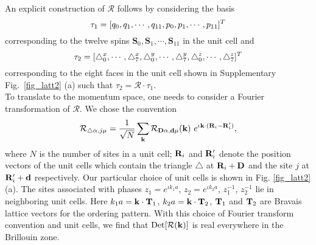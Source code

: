 \documentclass[a4paper,aps,prl,floatfix,showpacs,superscriptaddress,notitlepage]{revtex4-1}
\def\spin{\mathbf{S}} %
\begin{document}
An explicit construction of ${\mathcal R}$ follows by considering the basis 
\begin{equation}
 \tau_1= [q_0,q_1,\cdots,\\ q_{11},p_0,p_1,\cdots,p_{11}]^T \nonumber \\
\end{equation}
corresponding to the twelve spins $\spin_0,\spin_1,\cdots,\spin_{11}$ in the unit cell and 
\begin{equation}
 \tau_2=[\triangle_0^x,\cdots,\triangle_7^x,\triangle_0^y,\cdots,\triangle_7^y,\triangle_0^z,\cdots,\triangle_7^z]^T \nonumber \\
\end{equation}
corresponding to the eight faces in the unit cell shown in Supplementary Fig.~\ref{fig_latt2} (a) such that $\tau_2=\mathcal{R}\cdot \tau_1$. \\


To translate to the momentum space, one needs to consider a Fourier transformation of $\mathcal{R}$. We chose the convention
\begin{equation}
  {\mathcal R}_{\triangle\alpha,j\mu} = \frac{1}{\sqrt{N}} \sum_{\bf{k}} {\mathcal R}_{{\bf{D}}\alpha,{\bf{d}}\mu} ({\bf{k}}) ~ e^{\iota {\bf{k}}\cdot({\bf{R}}_i-{\bf{R}}'_i)},
  \label{fourier_A}
\end{equation}
where $N$ is the number of sites in a unit cell; ${\bf{R}}_i$ and ${\bf{R}}'_i$ denote the position vectors of the unit cells which contain the triangle $\triangle$ at ${\bf{R}}_i+{\bf{D}}$ and the site $j$ at ${\bf{R}}'_i+{\bf{d}}$ respectively. Our particular choice of unit cells is shown in Fig. \ref{fig_latt2} (a). The sites associated with phases $z_1=e^{\iota k_1a}$, $z_2=e^{\iota k_2a}$, $z_1^{-1}$, $z_2^{-1}$ lie in neighboring unit cells. Here $k_1a = {\bf k}\cdot{\bf T}_1$, $k_2a = {\bf k}\cdot{\bf T}_2$, ${\bf T}_1$ and ${\bf T}_2$ are Bravais lattice vectors for the ordering pattern. With this choice of Fourier transform convention and unit cells, we find that ${\rm Det}[\mathcal{R}({\bf k})]$ is real everywhere in the Brillouin zone.\\
\end{document}
